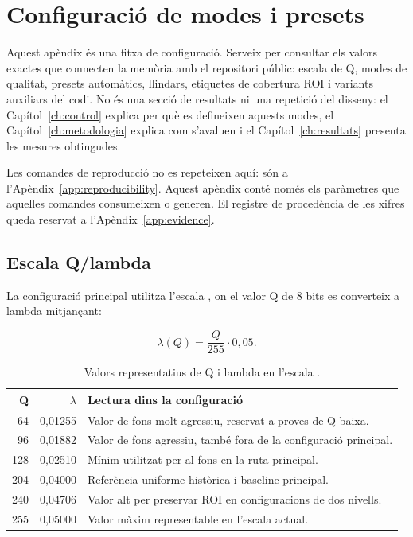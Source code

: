 \chapter{Configuració de modes i presets}\label{app:configuration}\label{app:config}
\fancyhead[LO]{\slshape \textsf{\nouppercase \rightmark}}

Aquest apèndix és una fitxa de configuració. Serveix per consultar els valors
exactes que connecten la memòria amb el repositori públic: escala de Q, modes de
qualitat, presets automàtics, llindars, etiquetes de cobertura ROI i variants
auxiliars del codi. No és una secció de resultats ni una repetició del disseny:
el Capítol~\ref{ch:control} explica per què es defineixen aquests modes, el
Capítol~\ref{ch:metodologia} explica com s'avaluen i el
Capítol~\ref{ch:resultats} presenta les mesures obtingudes.

Les comandes de reproducció no es repeteixen aquí: són a
l'Apèndix~\ref{app:reproducibility}. Aquest apèndix conté només els paràmetres
que aquelles comandes consumeixen o generen. El registre de procedència de les
xifres queda reservat a l'Apèndix~\ref{app:evidence}.

\section{Escala Q/lambda}

La configuració principal utilitza l'escala , on el valor Q de
8 bits es converteix a lambda mitjançant:

\begin{equation}
\lambda(Q)=\frac{Q}{255}\cdot0,05.
\label{eq:app_q_lambda}
\end{equation}

\begin{table}[H]
\centering
\small
\begin{tabularx}{\textwidth}{r r X}
\toprule
Q & $\lambda$ & Lectura dins la configuració \\
\midrule
64 & 0,01255 & Valor de fons molt agressiu, reservat a proves de Q baixa. \\
96 & 0,01882 & Valor de fons agressiu, també fora de la configuració principal. \\
128 & 0,02510 & Mínim utilitzat per al fons en la ruta principal. \\
204 & 0,04000 & Referència uniforme històrica i baseline principal. \\
240 & 0,04706 & Valor alt per preservar ROI en configuracions de dos nivells. \\
255 & 0,05000 & Valor màxim representable en l'escala actual. \\
\bottomrule
\end{tabularx}
\caption{Valors representatius de Q i lambda en l'escala .}
\label{tab:q_lambda_appendix}
\end{table}

